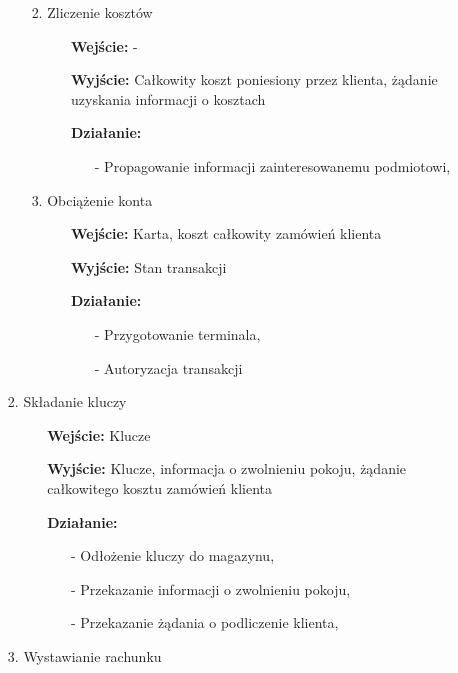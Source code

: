 \documentclass[a4paper, 11pt]{article}
\begin{document}
\begin{enumerate}[label*=\arabic*.]
\begin{enumerate}[label*=\arabic*.]
\begin{enumerate}[label*=\arabic*.]
\begin{enumerate}[label*=\arabic*.]
\begin{itemize}
\begin{itemize}
						\end{itemize}
					\end{itemize}
					\item Zliczenie kosztów
					\begin{itemize}
						\item [\textbf{Wejście:}] -
						\item [\textbf{Wyjście:}] Całkowity koszt poniesiony przez klienta, żądanie uzyskania informacji o kosztach
						\item [\textbf{Działanie:}] 
						\begin{itemize}
							\item[-] Propagowanie informacji zainteresowanemu podmiotowi,
						\end{itemize}
					\end{itemize}
					\item Obciążenie konta
					\begin{itemize}
						\item [\textbf{Wejście:}] Karta, koszt całkowity zamówień klienta
						\item [\textbf{Wyjście:}] Stan transakcji
						\item [\textbf{Działanie:}] 
						\begin{itemize}
							\item[-] Przygotowanie terminala,
							\item[-] Autoryzacja transakcji
						\end{itemize}
					\end{itemize}
				\end{enumerate}													
				\item Składanie kluczy
				\begin{itemize}
					\item [\textbf{Wejście:}] Klucze
					\item [\textbf{Wyjście:}] Klucze, informacja o zwolnieniu pokoju, żądanie całkowitego kosztu zamówień klienta
					\item [\textbf{Działanie:}] 
					\begin{itemize}
						\item[-] Odłożenie kluczy do magazynu,
						\item[-] Przekazanie informacji o zwolnieniu pokoju,
						\item[-] Przekazanie żądania o podliczenie klienta,
					\end{itemize}
				\end{itemize}
				\item Wystawianie rachunku

\end{enumerate}
\end{enumerate}
\end{enumerate}
\end{document}
